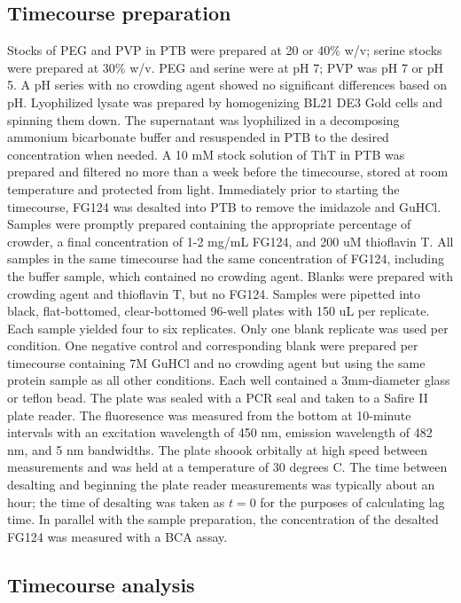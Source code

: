 \subsection{Timecourse preparation} Stocks of PEG and PVP in PTB were prepared at 20 or 40\% w/v; serine stocks were prepared at 30\% w/v.  PEG and serine were at pH 7; PVP was pH 7 or pH 5.  A pH series with no crowding agent showed no significant differences based on pH.  Lyophilized lysate was prepared by homogenizing BL21 DE3 Gold cells and spinning them down.  The supernatant was lyophilized in a decomposing ammonium bicarbonate buffer and resuspended in PTB to the desired concentration when needed.  A 10 mM stock solution of ThT in PTB was prepared and filtered no more than a week before the timecourse, stored at room temperature and protected from light.  Immediately prior to starting the timecourse, FG124 was desalted into PTB to remove the imidazole and GuHCl.  Samples were promptly prepared containing the appropriate percentage of crowder, a final concentration of 1-2 mg/mL FG124, and 200 uM thioflavin T.  All samples in the same timecourse had the same concentration of FG124, including the buffer sample, which contained no crowding agent.  Blanks were prepared with crowding agent and thioflavin T, but no FG124.  Samples were pipetted into black, flat-bottomed, clear-bottomed 96-well plates with 150 uL per replicate.  Each sample yielded four to six replicates.  Only one blank replicate was used per condition.  One negative control and corresponding blank were prepared per timecourse containing 7M GuHCl and no crowding agent but using the same protein sample as all other conditions.  Each well contained a 3mm-diameter glass or teflon bead.  The plate was sealed with a PCR seal and taken to a Safire II plate reader.  The fluoresence was measured from the bottom at 10-minute intervals with an excitation wavelength of 450 nm, emission wavelength of 482 nm, and 5 nm bandwidths.  The plate shoook orbitally at high speed between measurements and was held at a temperature of 30 degrees C.  The time between desalting and beginning the plate reader measurements was typically about an hour; the time of desalting was taken as $t=0$ for the purposes of calculating lag time. In parallel with the sample preparation, the concentration of the desalted FG124 was measured with a BCA assay.
\subsection{Timecourse analysis}

